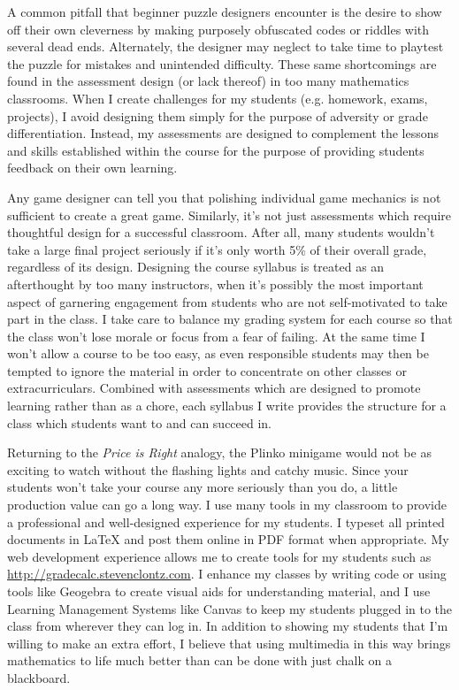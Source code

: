 \documentclass[11pt]{amsart}
\theoremstyle{plain}
\newcommand{\<}{\langle}
\renewcommand{\>}{\rangle}
\begin{document}
A common pitfall that beginner puzzle designers encounter is the desire to
show off their own cleverness by making purposely obfuscated codes or riddles
with several dead ends. Alternately, the designer may neglect to take time to
playtest the puzzle for mistakes and unintended difficulty. These same
shortcomings are found in the assessment design (or lack thereof) in too many
mathematics classrooms. When I create challenges for my students (e.g. homework,
exams, projects), I avoid designing them simply for the purpose of
adversity or grade differentiation. Instead, my assessments are designed to
complement the lessons and skills established within the course for the purpose
of providing students feedback on their own learning.

Any game designer can tell you that polishing individual game mechanics is not
sufficient to create a great game. Similarly, it's not just assessments which
require thoughtful design for a successful classroom.
After all, many students wouldn't take a large final
project seriously if it's only worth 5\% of their overall grade, regardless
of its design. Designing the
course syllabus is treated as an afterthought by too many instructors, when
it's possibly the most important aspect of garnering engagement from students
who are not self-motivated to take part in the class. I take care to
balance my grading system for each course so that the class won't lose
morale or focus from a fear of failing. At the same time I won't allow a
course to be too easy, as even responsible students may then
be tempted to ignore the material in order to
concentrate on other classes or extracurriculars. Combined with assessments
which are designed to promote learning rather than as a chore, each
syllabus I write provides the structure for a class which students want
to and can succeed in.

Returning to the
\textit{Price is Right} analogy, the Plinko minigame would not be as exciting
to watch without the flashing lights and catchy music. Since your students
won't take your course any more seriously than you do, a little production value
can go a long way.  I use many tools in
my classroom to provide a professional and well-designed experience for my
students. I typeset all printed documents in \LaTeX{} and post them online
in PDF format when appropriate. My web development experience allows me to
create tools for my students such as \url{http://gradecalc.stevenclontz.com}.
I enhance my classes by writing code or using tools like Geogebra to create
visual aids for understanding material, and I use Learning Management Systems
like Canvas to keep my students plugged in to the class from wherever
they can log in. In addition to showing my students
that I'm willing to make an extra effort, I believe that using multimedia in
this way brings mathematics to life much better than can be done with just
chalk on a blackboard.
\end{document}
